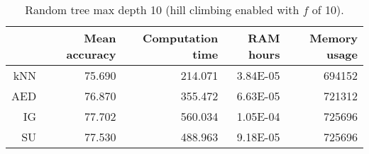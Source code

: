 \begin{table}[h]
\centering
\begin{tabular}{r|rrrr}	
    & Mean accuracy & Computation time & RAM hours & Memory usage \\ \hline
kNN & 75.690                   & 214.071          & 3.84E-05  & 694152       \\
AED & 76.870                   & 355.472          & 6.63E-05  & 721312       \\
IG  & 77.702                   & 560.034          & 1.05E-04  & 725696       \\
SU  & 77.530                   & 488.963          & 9.18E-05  & 725696      
\end{tabular}
\caption{Random tree max depth 10 (hill climbing enabled with $f$ of 10).}
\label{Table:TreeD10_H}
\end{table}